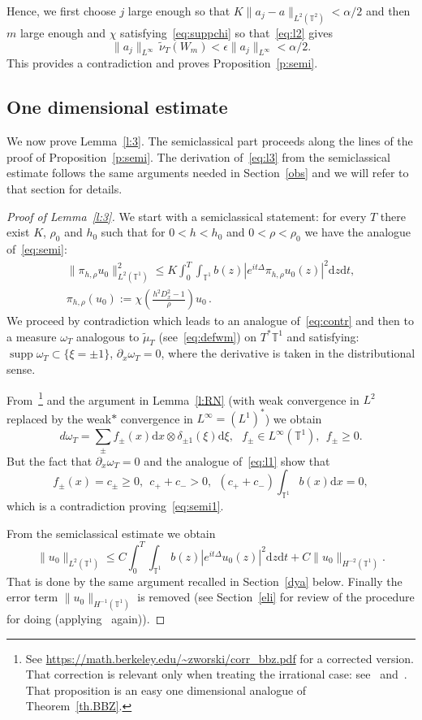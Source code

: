 \documentclass[11pt]{article}
\theoremstyle{definition}
\numberwithin{equation}{section}
\numberwithin{figure}{section}
\numberwithin{table}{section}
\DeclareMathOperator{\supp}{supp}
\newcommand{\TT}{{\mathbb T}}
\newcommand*{\dd}{\mathrm{d}}
\newcommand*{\dx}{\dd x}
\newcommand*{\dz}{\dd z}
\newcommand*{\dt}{\dd t}
\newcommand*{\dxi}{\dd \xi}
\begin{document}
Hence, we first choose $ j $ large enough so that $ K \| a_j - a \|_{L^2 (\TT^2) } < \alpha/2 $ and then $ m $ large enough and $ \chi $ satisfying~\eqref{eq:suppchi} so that~\eqref{eq:l2} gives
\[
\| a_j \|_{ L^\infty } \, \widetilde \nu_T (W_m) <
\epsilon \| a_j \|_{ L^\infty } < \alpha/2.
\]
This provides a contradiction and proves Proposition~\ref{p:semi}.

\subsection{One dimensional estimate}\label{1D}

We now prove Lemma~\ref{l:3}. The semiclassical part proceeds along the lines of the proof of Proposition~\ref{p:semi}. The derivation of~\eqref{eq:l3} from the semiclassical estimate follows the same arguments needed in Section~\ref{obs} and we will refer to that section for details.

\begin{proof}[Proof of Lemma~\ref{l:3}]
We start with a semiclassical statement: for every $ T $ there exist $ K$, $ \rho_0 $ and $ h_0 $ such that for $ 0 < h < h_0 $ and $ 0 < \rho < \rho_0 $ we have the analogue of~\eqref{eq:semi}:
\begin{multline}\label{eq:semi1}
\| \pi_{h, \rho} u_0 \|_{ L^2 (\TT^1) }^2 \leq K \int_0^T \!\!\int_{ \TT^1}b (z) | e^{ i t \Delta} \pi_{h, \rho} u_0 (z) |^2 \dz \dt,
\\
\pi_{h, \rho} (u_0) := \chi \left(\frac{ h^2 D_x^2 - 1} {\rho} \right) u_0 \,.
\end{multline}
We proceed by contradiction which leads to an analogue of~\eqref{eq:contr} and then to a measure $ \omega_T $ analogous to $ \widetilde \mu_T $ (see~\eqref{eq:defwm}) on $ T^* \TT^1 $ and satisfying: $ \supp \omega_T \subset \{ \xi = \pm 1 \} $, $\partial_x \omega_T = 0$, where the derivative is taken in the distributional sense.

From~\cite[Proposition~2.1]{BBZ}\footnote{See \url{https://math.berkeley.edu/~zworski/corr_bbz.pdf} for a corrected version. That correction is relevant only when treating the irrational case: see~\cite{BZ4} and~\cite{BBZ}. That proposition is an easy one dimensional analogue of Theorem~\ref{th.BBZ}.} and the argument in Lemma~\ref{l:RN} (with weak convergence in $L^2 $ replaced by the weak$*$ convergence in $ L^\infty = (L^1)^* $) we obtain
\[
d \omega_T = \sum_{ \pm } f_\pm (x) \dx \otimes \delta_{\pm 1} (\xi) \dxi, \ \ \ f_\pm \in L^\infty (\TT^1), \ \ f_\pm \geq 0.
\]
But the fact that $ \partial_x \omega_T = 0 $ and the analogue of~\eqref{eq:l1} show that
\[
f_\pm (x) = c_\pm \geq 0, \ \ c_+ + c_- > 0, \ \ (c_+ + c_-)\int _{\TT^1 } b (x) \dx = 0,
\]
which is a contradiction proving~\eqref{eq:semi1}.

From the semiclassical estimate we obtain
\[
\| u_0\|_{L^2 (\TT^1) } \leq C
\int_0^T \!\!\int_{ \TT^1}b (z) | e^{ i t \Delta} u_0 (z) |^2 \dz \dt + C \| u_0 \|_{ H^{-2}(\TT^1)}.
\]
That is done by the same argument recalled in Section~\ref{dya} below. Finally the error term $ \| u_0 \|_{ H^{-1}(\TT^1) } $ is removed (see Section~\ref{eli} for review of the procedure for doing (applying~\cite[Proposition~2.1]{BBZ} again)).
\end{proof}
\end{document}
